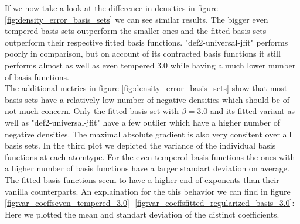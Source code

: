 If we now take a look at the difference in densities in figure \ref{fig:density_error_basis_sets} we can see similar results. The bigger even tempered basis sets outperform the smaller ones and the fitted basis sets outperform their respective fitted basis functions. "def2-universal-jfit" performs poorly in comparison, but on account of its contracted basis functions it still performs almost as well as even tempered 3.0 while having a much lower number of basis functions.\\
The additional metrics in figure \ref{fig:density_error_basis_sets} show that most basis sets have a relatively low number of negative densities which should be of not much concern. Only the fitted basis set with $\beta = 3.0$ and its fitted variant as well as "def2-universal-jfit" have a few outlier which have a higher number of negative densities. The maximal absolute gradient is also very consitent over all basis sets.
In the third plot we depicted the variance of the individual basis functions at each atomtype. For the even tempered basis functions the ones with a higher number of basis functions have a larger standart deviation on average. The fitted basis functions seem
 to have a higher end of exponents than their vanilla counterparts. An explaination for the this behavior we can find in figure \ref{fig:var_coeffseven_tempered_3.0}- \ref{fig:var_coeffsfitted_regularized_basis_3.0}: Here we plotted the mean and standart deviation of the distinct coefficients.


